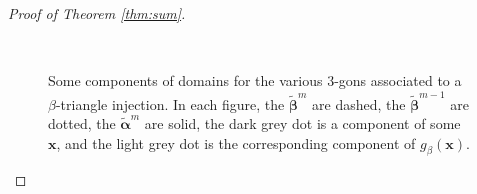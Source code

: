 \documentclass[11pt]{article}
\theoremstyle{plain} \newtheorem{thm}{Theorem}[subsection]
\theoremstyle{plain} \newtheorem{cor}[thm]{Corollary}
\theoremstyle{plain} \newtheorem{prop}[thm]{Proposition}
\theoremstyle{plain} \newtheorem{conj}[thm]{Conjecture}
\theoremstyle{plain} \newtheorem{lem}[thm]{Lemma}
\theoremstyle{definition} \newtheorem{df}[thm]{Definition}
\theoremstyle{remark} \newtheorem{rmk}[thm]{Remark}
\theoremstyle{remark} \newtheorem{obs}[thm]{Observation}
\newcommand{\tld}[1]{\widetilde{#1}}
\newcommand{\bat}{\boldsymbol{\tld{\alpha}}}
\newcommand{\bbt}{\boldsymbol{\tld{\beta}}}
\newcommand{\bx}{\mathbf{x}}
\numberwithin{equation}{section}
\begin{document}
\begin{proof}[Proof of Theorem \ref{thm:sum}]
\begin{figure}[h!]
\centering
{}\quad
{}\quad
{}\\
\quad
{}\quad
{}
\caption[Components of domains of 3-gons associated to $g_{\beta}$ in the proof of Theorem \ref{thm:sum}]{Some components of domains for the various 3-gons associated to a $\beta$-triangle injection.  In each figure, the $\bbt^m$ are dashed, the $\bbt^{m-1}$ are dotted, the $\bat^{m}$ are solid, the dark grey dot is a component of some $\bx$, and the light grey dot is the corresponding component of $g_\beta(\bx)$.\label{fig:CStriB}}
\end{figure}


\end{proof}
\end{document}
